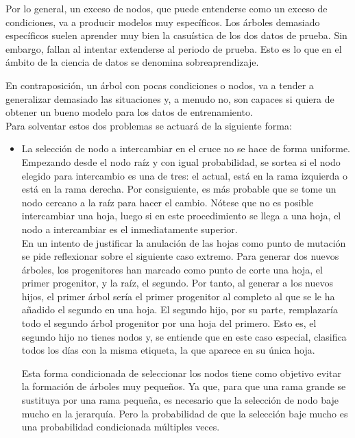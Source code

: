 Por lo general, un exceso de nodos, que puede entenderse como un exceso de condiciones, va a producir modelos muy espec\'ificos. Los \'arboles demasiado espec\'ificos suelen aprender muy bien la casu\'istica de los dos datos de prueba. Sin embargo, fallan al intentar extenderse al periodo de prueba. Esto es lo que en el \'ambito de la ciencia de datos se denomina sobreaprendizaje.

En contraposici\'on, un \'arbol con pocas condiciones o nodos, va a tender a generalizar demasiado las situaciones y, a menudo no, son capaces si quiera de obtener un bueno modelo para los datos de entrenamiento.\\

Para solventar estos dos problemas se actuar\'a de la siguiente forma:

\begin{itemize}
    \item La selecci\'on de nodo a intercambiar en el cruce no se hace de forma uniforme. Empezando desde el nodo ra\'iz y con igual probabilidad, se sortea si el nodo elegido para intercambio es una de tres: el actual, est\'a en la rama izquierda o est\'a en la rama derecha. Por consiguiente, es m\'as probable que se tome un nodo cercano a la ra\'iz para hacer el cambio. N\'otese que no es posible intercambiar una hoja, luego si en este procedimiento se llega a una hoja, el nodo a intercambiar es el inmediatamente superior.\\
    
    En un intento de justificar la anulaci\'on de las hojas como punto de mutaci\'on se pide reflexionar sobre el siguiente caso extremo. Para generar dos nuevos \'arboles, los progenitores han marcado como punto de corte una hoja, el primer progenitor, y la ra\'iz, el segundo. Por tanto, al generar a los nuevos hijos, el primer \'arbol ser\'ia el primer progenitor al completo al que se le ha a\~nadido el segundo en una hoja. El segundo hijo, por su parte, remplazar\'ia todo el segundo \'arbol progenitor por una hoja del primero. Esto es, el segundo hijo no tienes nodos y, se entiende que en este caso especial, clasifica todos los d\'ias con la misma etiqueta, la que aparece en su \'unica hoja. 
    
    Esta forma condicionada de seleccionar los nodos tiene como objetivo evitar la formaci\'on de \'arboles muy peque\~nos. Ya que, para que una rama grande se sustituya por una rama peque\~na, es necesario que la selecci\'on de nodo baje mucho en la jerarqu\'ia. Pero la probabilidad de que la selecci\'on baje mucho es una probabilidad condicionada m\'ultiples veces.
    

\end{itemize}
